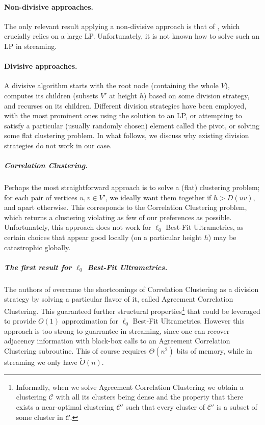 \documentclass{article}
\begin{document}
\vspace{-3mm}

\paragraph{Non-divisive approaches.} The only relevant result applying a non-divisive approach is that of \cite{debarati}, which crucially relies on a large LP.
Unfortunately, it is not known how to solve such an LP in streaming.

\vspace{-3mm}

\paragraph{Divisive approaches.} A divisive algorithm starts with the root node (containing the whole $V$), computes its children (subsets $V'$ at height $h$) based on some division strategy, and recurses on its children. Different division strategies have been employed, with the most prominent ones using the solution to an LP, or attempting to satisfy a particular (usually randomly chosen) element called the pivot, or solving some flat clustering problem. In what follows, we discuss why existing division strategies do not work in our case.

\subparagraph{Correlation Clustering.} Perhaps the most straightforward approach is to solve a (flat) clustering problem; for each pair of vertices $u,v\in V'$, we ideally want them together if $h>D(uv)$, and apart otherwise.
This corresponds to the Correlation Clustering problem, which returns a clustering violating as few of our preferences as possible.
Unfortunately, this approach does not work for $\ell_0$ Best-Fit Ultrametrics, as certain choices that appear good locally (on a particular height $h$) may be catastrophic globally.

\subparagraph{The first result for $\ell_0$ Best-Fit Ultrametrics.} The authors of \cite{cohen2022fitting} overcame the shortcomings of Correlation Clustering as a division strategy by solving a particular flavor of it, called Agreement Correlation Clustering. This guaranteed further structural properties\footnote{Informally, when we solve Agreement Correlation Clustering we obtain a clustering $\mathcal{C}$ with all its clusters being dense and the property that there exists a near-optimal clustering $\mathcal{C'}$ such that every cluster of $\mathcal{C'}$ is a subset of some cluster in $\mathcal{C}$.} that could be leveraged to provide $O(1)$ approximation for $\ell_0$ Best-Fit Ultrametrics. However this approach is too strong to guarrantee in streaming, since one can recover adjacency information with black-box calls to an Agreement Correlation Clustering subroutine. This of course requires $\Theta(n^2)$ bits of memory, while in streaming we only have $\widetilde{O}(n)$.
\end{document}
